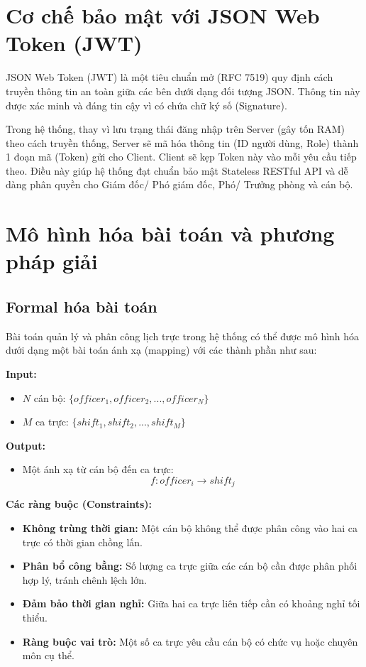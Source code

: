 \documentclass[18pt,a4paper]{report}
\begin{document}
\section{Cơ chế bảo mật với JSON Web Token (JWT)}
JSON Web Token (JWT) là một tiêu chuẩn mở (RFC 7519) quy định cách truyền thông tin an toàn giữa các bên dưới dạng đối tượng JSON. Thông tin này được xác minh và đáng tin cậy vì có chứa chữ ký số (Signature).

Trong hệ thống, thay vì lưu trạng thái đăng nhập trên Server (gây tốn RAM) theo cách truyền thống, Server sẽ mã hóa thông tin (ID người dùng, Role) thành 1 đoạn mã (Token) gửi cho Client. Client sẽ kẹp Token này vào mỗi yêu cầu tiếp theo. Điều này giúp hệ thống đạt chuẩn bảo mật Stateless RESTful API và dễ dàng phân quyền cho Giám đốc/ Phó giám đốc, Phó/ Trưởng phòng và cán bộ.

\section{Mô hình hóa bài toán và phương pháp giải}

\subsection{Formal hóa bài toán}
Bài toán quản lý và phân công lịch trực trong hệ thống có thể được mô hình hóa dưới dạng một bài toán ánh xạ (mapping) với các thành phần như sau:

\textbf{Input:}
\begin{itemize}[leftmargin=1.2cm]
    \item $N$ cán bộ: $\{officer_1, officer_2, ..., officer_N\}$
    \item $M$ ca trực: $\{shift_1, shift_2, ..., shift_M\}$
\end{itemize}

\textbf{Output:}
\begin{itemize}[leftmargin=1.2cm]
    \item Một ánh xạ từ cán bộ đến ca trực:
    \[
    f: officer_i \rightarrow shift_j
    \]
\end{itemize}

\textbf{Các ràng buộc (Constraints):}
\begin{itemize}[leftmargin=1.2cm]
    \item \textbf{Không trùng thời gian:} Một cán bộ không thể được phân công vào hai ca trực có thời gian chồng lấn.
    \item \textbf{Phân bổ công bằng:} Số lượng ca trực giữa các cán bộ cần được phân phối hợp lý, tránh chênh lệch lớn.
    \item \textbf{Đảm bảo thời gian nghỉ:} Giữa hai ca trực liên tiếp cần có khoảng nghỉ tối thiểu.
    \item \textbf{Ràng buộc vai trò:} Một số ca trực yêu cầu cán bộ có chức vụ hoặc chuyên môn cụ thể.
\end{itemize}
\end{document}
